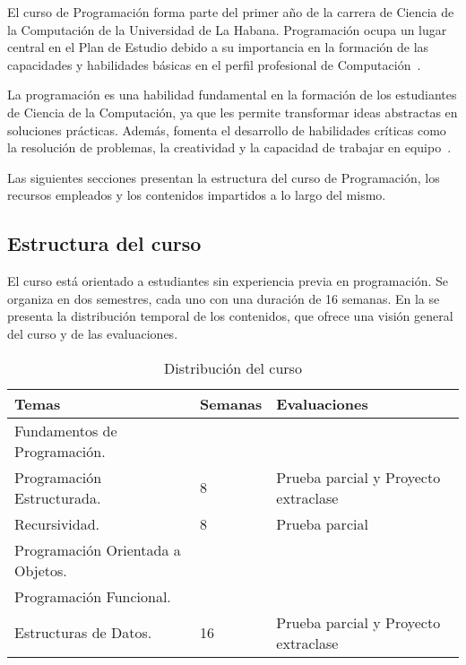 El curso de Programación forma parte del primer año de la carrera de Ciencia de la Computación de la Universidad de La Habana. Programación ocupa un lugar central en el Plan de Estudio debido a su importancia en la formación de las capacidades y habilidades básicas en el perfil profesional de Computación~\cite{plan_estudio_e_2017}.

La programación es una habilidad fundamental en la formación de los estudiantes de Ciencia de la Computación, ya que les permite transformar ideas abstractas en soluciones prácticas. Además, fomenta el desarrollo de habilidades críticas como la resolución de problemas, la creatividad y la capacidad de trabajar en equipo~\cite{plan_estudio_e_2017}.

Las siguientes secciones presentan la estructura del curso de Programación, los recursos empleados y los contenidos impartidos a lo largo del mismo.

\subsection{Estructura del curso}

El curso está orientado a estudiantes sin experiencia previa en programación. Se organiza en dos semestres, cada uno con una duración de 16 semanas. En la  se presenta la distribución temporal de los contenidos, que ofrece una visión general del curso y de las evaluaciones.

\begin{table}[h!]
    \centering
    \begin{tabular}{|p{6.5cm}|p{2cm}|p{3.5cm}|}
    \hline
    \textbf{Temas} & \textbf{Semanas} & \textbf{Evaluaciones} \\ \hline
    \raggedright Fundamentos de Programación. \\ Programación Estructurada. 
    & 8 & Prueba parcial y Proyecto extraclase \\ \hline
    \raggedright Recursividad.
    & 8 & Prueba parcial \\ \hline
    \raggedright Programación Orientada a Objetos. \\ Programación Funcional. \\ Estructuras de Datos. 
    & 16 & Prueba parcial y Proyecto extraclase \\ \hline
    \end{tabular}
    \caption{Distribución del curso}\label{tab:course_distribution}
\end{table}
    

